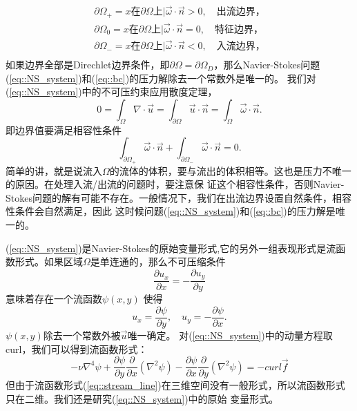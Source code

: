         \begin{equation}
            \begin{aligned}
                \partial \Omega_{+} = {x \mbox{在} \partial \Omega \mbox{上}|\vec{\omega} \cdot \vec{n} > 0}, \quad \mbox{出流边界}，\\
                \partial \Omega_{0} = {x \mbox{在} \partial \Omega \mbox{上}|\vec{\omega} \cdot \vec{n} = 0}, \quad \mbox{特征边界}，\\
                \partial \Omega_{-} = {x \mbox{在} \partial \Omega \mbox{上}|\vec{\omega} \cdot \vec{n} < 0}, \quad \mbox{入流边界}，\\
            \end{aligned}
        \end{equation}
        如果边界全部是Direchlet边界条件，即$\partial \Omega = \partial \Omega_D$，那么Navier-Stokes问题
        (\ref{eq::NS_system})和(\ref{eq::bc})的压力解除去一个常数外是唯一的。
        我们对(\ref{eq::NS_system})中的不可压约束应用散度定理，
        \begin{equation}
            0 = \int_{\Omega} \nabla \cdot \vec{u} = \int_{\partial \Omega} \vec{u} \cdot \vec{n} = \int_{\Omega} \vec{\omega} \cdot \vec{n}.
        \end{equation}
        即边界值要满足相容性条件
        \begin{equation}
            \int_{\partial \Omega_{+}} \vec{\omega} \cdot \vec{n} + \int_{\partial \Omega_{-}} \vec{\omega} \cdot \vec{n} = 0.
        \end{equation}
        简单的讲，就是说流入$\Omega$的流体的体积，要与流出的体积相等。这也是压力不唯一的原因。在处理入流/出流的问题时，要注意保
        证这个相容性条件，否则Navier-Stokes问题的解有可能不存在。一般情况下，我们在出流边界设置自然条件，相容性条件会自然满足，因此
        这时候问题(\ref{eq::NS_system})和(\ref{eq::bc})的压力解是唯一的。

        (\ref{eq::NS_system})是Navier-Stokes的原始变量形式,它的另外一组表现形式是流函数形式。如果区域$\Omega$是单连通的，那么不可压缩条件
        \begin{equation}
            \frac{\partial u_x}{\partial x} = -\frac{\partial u_y}{\partial y}
        \end{equation}
        意味着存在一个流函数$\psi(x, y)$ 使得
        \begin{equation}
            u_x = \frac{\partial \psi}{\partial y}, \quad u_y = -\frac{\partial \psi}{\partial x}.
        \end{equation}
        $\psi(x, y)$除去一个常数外被$\vec{u}$唯一确定。
        对(\ref{eq::NS_system})中的动量方程取curl，我们可以得到流函数形式：
        \begin{equation}
            -\nu \nabla^4 \psi + \frac{\partial \psi}{\partial y}\frac{\partial}{\partial x}(\nabla^2\psi) - \frac{\partial \psi}{\partial x}\frac{\partial }{\partial y}(\nabla^2 \psi) = -curl \vec{f}
            \label{eq::stream_line}
        \end{equation}
        但由于流函数形式(\ref{eq::stream_line})在三维空间没有一般形式，所以流函数形式只在二维。我们还是研究(\ref{eq::NS_system})中的原始
        变量形式。
